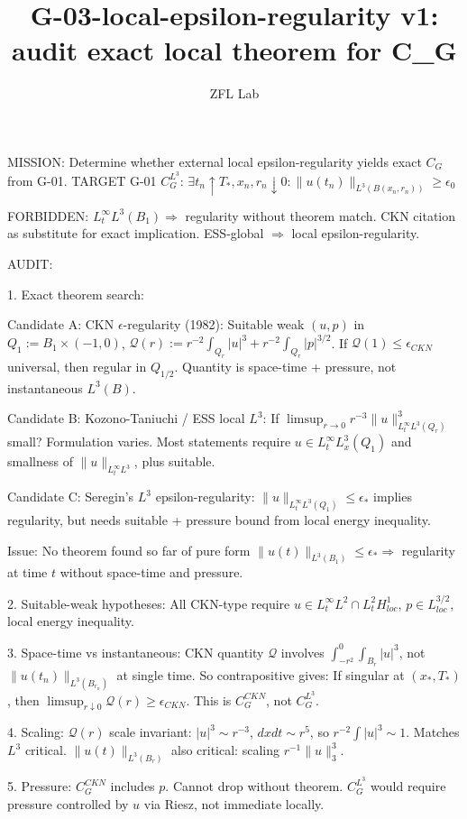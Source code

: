 \documentclass[11pt]{article}
\title{G-03-local-epsilon-regularity v1: audit exact local theorem for C\_G}
\author{ZFL Lab}
\begin{document}
\maketitle

MISSION: Determine whether external local epsilon-regularity yields exact $C_G$ from G-01.
TARGET G-01 $C_G^{L^3}$: $\exists t_n\uparrow T_*, x_n, r_n\downarrow0: \|u(t_n)\|_{L^3(B(x_n,r_n))}\ge\epsilon_0$

FORBIDDEN:
$L^\infty_t L^3(B_1)\Rightarrow$ regularity without theorem match.
CKN citation as substitute for exact implication.
ESS-global $\Rightarrow$ local epsilon-regularity.

AUDIT:

1. Exact theorem search:

Candidate A: CKN $\epsilon$-regularity (1982):
Suitable weak $(u,p)$ in $Q_1:=B_1\times(-1,0)$,
$\mathcal{Q}(r):= r^{-2}\int_{Q_r}|u|^3 + r^{-2}\int_{Q_r}|p|^{3/2}$.
If $\mathcal{Q}(1)\le\epsilon_{CKN}$ universal, then regular in $Q_{1/2}$.
Quantity is space-time + pressure, not instantaneous $L^3(B)$.

Candidate B: Kozono-Taniuchi / ESS local $L^3$:
If $\limsup_{r\to0} r^{-3}\|u\|_{L^\infty_t L^3(Q_r)}^3$ small? Formulation varies.
Most statements require $u\in L^\infty_t L^3_x(Q_1)$ and smallness of $\|u\|_{L^\infty_t L^3}$, plus suitable.

Candidate C: Seregin's $L^3$ epsilon-regularity: $ \|u\|_{L^\infty_t L^3(Q_1)}\le\epsilon_*$ implies regularity, but needs suitable + pressure bound from local energy inequality.

Issue: No theorem found so far of pure form $\|u(t)\|_{L^3(B_1)}\le\epsilon_*\Rightarrow$ regularity at time $t$ without space-time and pressure.

2. Suitable-weak hypotheses:
All CKN-type require $u\in L^\infty_t L^2\cap L^2_t H^1_{loc}$, $p\in L^{3/2}_{loc}$, local energy inequality.

3. Space-time vs instantaneous:
CKN quantity $\mathcal{Q}$ involves $ \int_{-r^2}^0\int_{B_r} |u|^3$, not $\|u(t_n)\|_{L^3(B_{r_n})}$ at single time. So contrapositive gives:
If singular at $(x_*,T_*)$, then $\limsup_{r\downarrow0}\mathcal{Q}(r)\ge\epsilon_{CKN}$.
This is $C_G^{CKN}$, not $C_G^{L^3}$.

4. Scaling:
$\mathcal{Q}(r)$ scale invariant: $|u|^3\sim r^{-3}$, $dxdt\sim r^5$, so $r^{-2}\int |u|^3\sim1$. Matches $L^3$ critical.
$ \|u(t)\|_{L^3(B_r)} $ also critical: scaling $r^{-1}\|u\|_3^3$.

5. Pressure:
$C_G^{CKN}$ includes $p$. Cannot drop without theorem. $C_G^{L^3}$ would require pressure controlled by $u$ via Riesz, not immediate locally.
\end{document}
